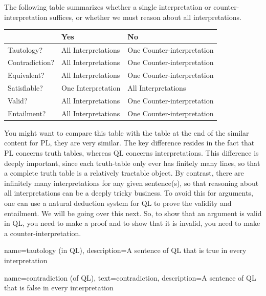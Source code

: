 The following table summarizes whether a single interpretation or counter-interpretation suffices, or whether we must reason about all interpretations.\\
\begin{tabular}{l|ll}
&Yes&No\\
\hline
Tautology?&All Interpretations&One Counter-interpretation\\
Contradiction?&All Interpretations&One Counter-interpretation\\
Equivalent?&All Interpretations&One Counter-interpretation\\
Satisfiable?&One Interpretation&All Interpretations\\
Valid?&All Interpretations&One Counter-interpretation\\
Entailment?&All Interpretations&One Counter-interpretation\\
\end{tabular}

You might want to compare this table with the table at the end of the similar content for PL, they are very similar. The key difference resides in the fact that PL concerns truth tables, whereas QL concerns interpretations. This difference is deeply important, since each truth-table only ever has finitely many lines, so that a complete truth table is a relatively tractable object. By contrast, there are infinitely many interpretations for any given sentence(s), so that reasoning about all interpretations can be a deeply tricky business. To avoid this for arguments, one can use a natural deduction system for QL to prove the validity and entailment. We will be going over this next. So, to show that an argument is valid in QL, you need to make a proof and to show that it is invalid, you need to make a counter-interpretation.  




{
name=tautology (in QL),
description={A \gls{sentence of QL} that is true in every \gls{interpretation}}
}

{
  name=contradiction (of QL),
  text=contradiction,
description={A \gls{sentence of QL} that is false in every \gls{interpretation}}
}

